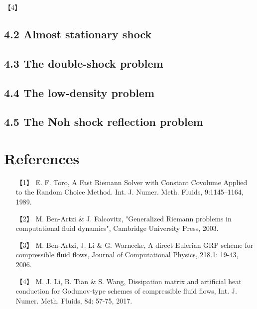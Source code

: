 \documentclass[CJK]{ctexart}
\begin{document}
【4】

\subsection*{4.2 Almost stationary shock}

\subsection*{4.3 The double-shock problem}

\subsection*{4.4 The low-density problem}

\subsection*{4.5 The Noh shock reflection problem}


\section*{References}

\begin{itemize}
\item[【1】] E. F. Toro, A Fast Riemann Solver with Constant Covolume Applied to the Random Choice Method. Int. J. Numer. Meth. Fluids, 9:1145–1164, 1989.

\item[【2】] M. Ben-Artzi \& J. Falcovitz, "Generalized Riemann problems in computational fluid dynamics", Cambridge University Press, 2003.

\item[【3】] M. Ben-Artzi, J. Li \& G. Warnecke, A direct Eulerian GRP scheme for compressible fluid flows, Journal of Computational Physics, 218.1: 19-43, 2006.

\item[【4】] M. J. Li, B. Tian \& S. Wang, Dissipation matrix and artificial heat conduction for Godunov-type schemes of compressible fluid flows, Int. J. Numer. Meth. Fluids, 84: 57-75, 2017.
\end{itemize}
\end{document}

